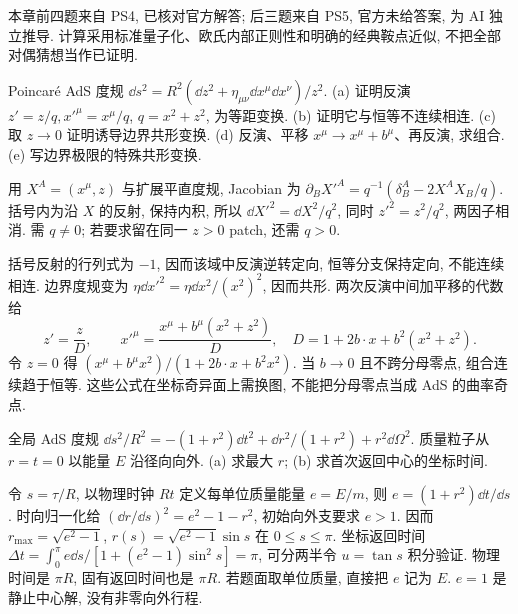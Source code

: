本章前四题来自 PS4, 已核对官方解答; 后三题来自 PS5, 官方未给答案, 为 AI 独立推导. 计算采用标准量子化、欧氏内部正则性和明确的经典鞍点近似, 不把全部对偶猜想当作已证明.

\begin{exercise}
Poincaré AdS 度规 $\dd s^2=R^2(\dd z^2+\eta_{\mu\nu}\dd x^\mu\dd x^\nu)/z^2$.
(a) 证明反演 $z'=z/q,x'^\mu=x^\mu/q$, $q=x^2+z^2$, 为等距变换.
(b) 证明它与恒等不连续相连.
(c) 取 $z\to0$ 证明诱导边界共形变换.
(d) 反演、平移 $x^\mu\to x^\mu+b^\mu$、再反演, 求组合.
(e) 写边界极限的特殊共形变换.
\end{exercise}
\begin{solution}
用 $X^A=(x^\mu,z)$ 与扩展平直度规, Jacobian 为 $\partial_BX'^A=q^{-1}(\delta^A_B-2X^AX_B/q)$. 括号内为沿 $X$ 的反射, 保持内积, 所以 $\dd X'^2=\dd X^2/q^2$, 同时 $z'^2=z^2/q^2$, 两因子相消. 需 $q\ne0$; 若要求留在同一 $z>0$ patch, 还需 $q>0$.

括号反射的行列式为 $-1$, 因而该域中反演逆转定向, 恒等分支保持定向, 不能连续相连. 边界度规变为 $\eta\dd x'^2=\eta\dd x^2/(x^2)^2$, 因而共形. 两次反演中间加平移的代数给
\[
z'=\frac zD,\qquad x'^\mu=\frac{x^\mu+b^\mu(x^2+z^2)}D,
\quad D=1+2b\cdot x+b^2(x^2+z^2).
\]
令 $z=0$ 得 $(x^\mu+b^\mu x^2)/(1+2b\cdot x+b^2x^2)$. 当 $b\to0$ 且不跨分母零点, 组合连续趋于恒等. 这些公式在坐标奇异面上需换图, 不能把分母零点当成 AdS 的曲率奇点.
\end{solution}

\begin{exercise}
全局 AdS 度规 $\dd s^2/R^2=-(1+r^2)\dd t^2+\dd r^2/(1+r^2)+r^2\dd\Omega^2$. 质量粒子从 $r=t=0$ 以能量 $E$ 沿径向向外.
(a) 求最大 $r$; (b) 求首次返回中心的坐标时间.
\end{exercise}
\begin{solution}
令 $s=\tau/R$, 以物理时钟 $Rt$ 定义每单位质量能量 $e=E/m$, 则 $e=(1+r^2)\dd t/\dd s$. 时向归一化给 $(\dd r/\dd s)^2=e^2-1-r^2$, 初始向外支要求 $e>1$. 因而 $r_{\max}=\sqrt{e^2-1}$, $r(s)=\sqrt{e^2-1}\sin s$ 在 $0\le s\le\pi$. 坐标返回时间
$\Delta t=\int_0^\pi e\dd s/[1+(e^2-1)\sin^2s]=\pi$, 可分两半令 $u=\tan s$ 积分验证. 物理时间是 $\pi R$, 固有返回时间也是 $\pi R$. 若题面取单位质量, 直接把 $e$ 记为 $E$. $e=1$ 是静止中心解, 没有非零向外行程.
\end{solution}

